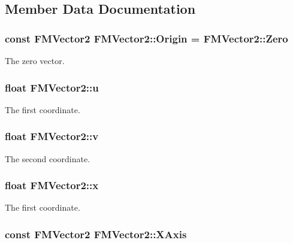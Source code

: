 \subsection{Member Data Documentation}
\hypertarget{classFMVector2_ac92a195612c79d7228214b8ad17d3c83}{
\subsubsection[{Origin}]{\setlength{\rightskip}{0pt plus 5cm}const {\bf FMVector2} {\bf FMVector2::Origin} = {\bf FMVector2::Zero}}}
\label{classFMVector2_ac92a195612c79d7228214b8ad17d3c83}
The zero vector. \hypertarget{classFMVector2_ae9271c21509c9a23fdeaacb30e3ec49f}{
\subsubsection[{u}]{\setlength{\rightskip}{0pt plus 5cm}float {\bf FMVector2::u}}}
\label{classFMVector2_ae9271c21509c9a23fdeaacb30e3ec49f}
The first coordinate. \hypertarget{classFMVector2_ad336a3412e6070c3419df8a82ccdfeac}{
\subsubsection[{v}]{\setlength{\rightskip}{0pt plus 5cm}float {\bf FMVector2::v}}}
\label{classFMVector2_ad336a3412e6070c3419df8a82ccdfeac}
The second coordinate. \hypertarget{classFMVector2_add13f67c553344452ad5274297afeebf}{
\subsubsection[{x}]{\setlength{\rightskip}{0pt plus 5cm}float {\bf FMVector2::x}}}
\label{classFMVector2_add13f67c553344452ad5274297afeebf}
The first coordinate. \hypertarget{classFMVector2_af1e472e6de273133987bb212befb2615}{
\subsubsection[{XAxis}]{\setlength{\rightskip}{0pt plus 5cm}const {\bf FMVector2} {\bf FMVector2::XAxis}}}
